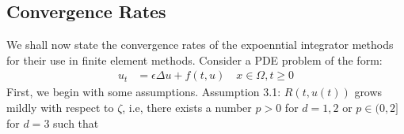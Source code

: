 \subsection{Convergence Rates}
We shall now state the convergence rates of the expoenntial integrator methods\cite{Huang2022} for their use in finite element methods.
Consider a PDE problem of the form:
\begin{align}
    u_t &= \epsilon \Delta u + f(t,u) \quad x\in \Omega, t\geq 0
\end{align}
First, we begin with some assumptions.
Assumption 3.1: $R(t,u(t))$ grows mildly with respect to $\zeta$, i.e, there exists a number $p>0$ for $d=1,2$ or $p\in(0,2]$ for $d=3$ such that

